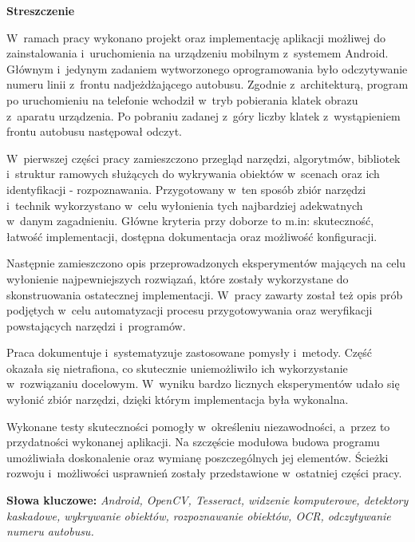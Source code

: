 \begin{center}
	\textbf{Streszczenie}
\end{center}

W~ramach pracy wykonano projekt oraz implementację aplikacji możliwej do zainstalowania 
i~uruchomienia
na urządzeniu mobilnym z~systemem Android. Głównym i~jedynym 
zadaniem wytworzonego oprogramowania
było odczytywanie numeru linii z~frontu nadjeżdżającego autobusu.
Zgodnie z~architekturą, program po uruchomieniu na telefonie
wchodził w~tryb pobierania klatek obrazu z~aparatu urządzenia. 
Po pobraniu zadanej z~góry liczby klatek z~wystąpieniem frontu
autobusu następował odczyt.

W~pierwszej części pracy zamieszczono przegląd narzędzi, algorytmów,
bibliotek i~struktur ramowych służących do wykrywania obiektów w~scenach
oraz ich identyfikacji - rozpoznawania. Przygotowany w~ten sposób
zbiór narzędzi i~technik wykorzystano w~celu wyłonienia tych najbardziej
adekwatnych w~danym zagadnieniu. Główne kryteria przy doborze to m.in:
skuteczność, łatwość implementacji, dostępna dokumentacja oraz możliwość
konfiguracji.

Następnie zamieszczono opis przeprowadzonych eksperymentów
mających na celu wyłonienie najpewniejszych rozwiązań, które
zostały wykorzystane do skonstruowania ostatecznej implementacji.
W~pracy zawarty został też opis prób podjętych w~celu automatyzacji
procesu przygotowywania oraz weryfikacji powstających narzędzi 
i~programów.

Praca dokumentuje i~systematyzuje zastosowane pomysły i~metody.
Część okazała się nietrafiona, co skutecznie uniemożliwiło ich
wykorzystanie w~rozwiązaniu docelowym. W~wyniku
bardzo licznych eksperymentów udało się wyłonić zbiór 
narzędzi, dzięki którym implementacja była wykonalna.

Wykonane testy skuteczności pomogły w~określeniu niezawodności,
a~przez to przydatności wykonanej aplikacji. Na szczęście
modułowa budowa programu umożliwiała doskonalenie oraz
wymianę poszczególnych jej elementów. Ścieżki rozwoju
i~możliwości usprawnień zostały przedstawione w~ostatniej
części pracy.


\vspace*{\baselineskip}

\noindent\textbf{Słowa kluczowe:} \textit{Android, OpenCV, Tesseract,
widzenie komputerowe, detektory kaskadowe, 
wykrywanie obiektów, rozpoznawanie obiektów,
OCR, odczytywanie numeru autobusu.}

\vspace*{2\baselineskip}
\newpage

